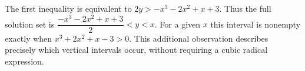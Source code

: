 The first inequality is equivalent to $2y>-x^3-2x^2+x+3$. Thus the full solution set is $\boxed{\dfrac{-x^3-2x^2+x+3}{2}<y<x}$. For a given $x$ this interval is nonempty exactly when $x^3+2x^2+x-3>0$. This additional observation describes precisely which vertical intervals occur, without requiring a cubic radical expression.
